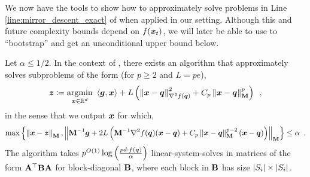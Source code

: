 We now have the tools to show how to approximately solve problems in Line \ref{line:mirror_descent_exact} of  when applied in our setting. Although this and future complexity bounds depend on $f(\bm{x}_t)$, we will later be able to use  to ``bootstrap'' and get an unconditional upper bound below.
\begin{lemma}
\label{lemma:gp_prox_relativesmoothsolve}
Let $\alpha \le 1/2$. In the context of , there exists an algorithm that approximately solves subproblems of the form (for $p\geq 2$ and $L=pe$),
\begin{align*}
    \bm{z} \coloneqq \underset{\bm{x}\in\mathbb{R}^d}{\mathrm{argmin}}\  \left\langle \bm{g},\bm{x} \right\rangle + L\left(\left\lVert \bm{x}-\bm{q} \right\rVert_{\nabla^2 f(\bm{q})}^2 + C_p\left\lVert \bm{x}-\bm{q} \right\rVert_{\mathbf{M}}^p\right)\enspace,
\end{align*}
in the sense that we output $\bm{x}$ for which,
\begin{equation*}
    \begin{aligned}
        \max\left\{\left\lVert \bm{x}-\bm{z} \right\rVert_{\mathbf{M}}, \left\lVert \mathbf{M}^{-1}\bm{g} + 2L\left(\mathbf{M}^{-1}\nabla^2 f(\bm{q})(\bm{x}-\bm{q}) + C_p\left\lVert \bm{x}-\bm{q} \right\rVert_{\mathbf{M}}^{p-2}(\bm{x}-\bm{q})\right) \right\rVert_{\mathbf{M}}\right\} \le \alpha
    \end{aligned}\enspace.
\end{equation*}
The algorithm takes $p^{O(1)}\log\left(\frac{pd \cdot f(\bm{q})}{\alpha}\right)$ linear-system-solves in matrices of the form $\mathbf{A}^{\top}\mathbf{B}\mathbf{A}$ for block-diagonal $\mathbf{B}$, where each block in $\mathbf{B}$ has size $\left\lvert S_i \right\rvert \times \left\lvert S_i \right\rvert$.
\end{lemma}

